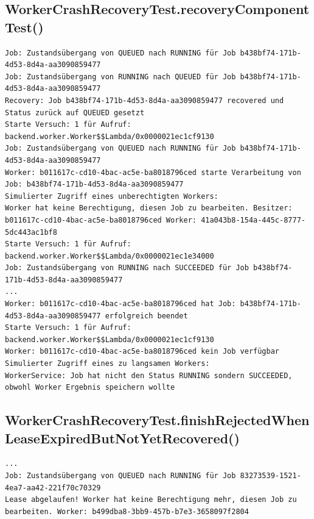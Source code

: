 \subsection*{WorkerCrashRecoveryTest.recoveryComponentTest()}
\label{subsec:testlog_z8_a}
\begin{lstlisting}[language={}, style=logs, numbers=none]
Job: Zustandsübergang von QUEUED nach RUNNING für Job b438bf74-171b-4d53-8d4a-aa3090859477
Job: Zustandsübergang von RUNNING nach QUEUED für Job b438bf74-171b-4d53-8d4a-aa3090859477
Recovery: Job b438bf74-171b-4d53-8d4a-aa3090859477 recovered und Status zurück auf QUEUED gesetzt
Starte Versuch: 1 für Aufruf: backend.worker.Worker$$Lambda/0x0000021ec1cf9130
Job: Zustandsübergang von QUEUED nach RUNNING für Job b438bf74-171b-4d53-8d4a-aa3090859477
Worker: b011617c-cd10-4bac-ac5e-ba8018796ced starte Verarbeitung von Job: b438bf74-171b-4d53-8d4a-aa3090859477
Simulierter Zugriff eines unberechtigten Workers:
Worker hat keine Berechtigung, diesen Job zu bearbeiten. Besitzer: b011617c-cd10-4bac-ac5e-ba8018796ced Worker: 41a043b8-154a-445c-8777-5dc443ac1bf8
Starte Versuch: 1 für Aufruf: backend.worker.Worker$$Lambda/0x0000021ec1e34000
Job: Zustandsübergang von RUNNING nach SUCCEEDED für Job b438bf74-171b-4d53-8d4a-aa3090859477
...
Worker: b011617c-cd10-4bac-ac5e-ba8018796ced hat Job: b438bf74-171b-4d53-8d4a-aa3090859477 erfolgreich beendet
Starte Versuch: 1 für Aufruf: backend.worker.Worker$$Lambda/0x0000021ec1cf9130
Worker: b011617c-cd10-4bac-ac5e-ba8018796ced kein Job verfügbar
Simulierter Zugriff eines zu langsamen Workers:
WorkerService: Job hat nicht den Status RUNNING sondern SUCCEEDED, obwohl Worker Ergebnis speichern wollte
\end{lstlisting}

\subsection*{WorkerCrashRecoveryTest.finishRejectedWhenLeaseExpiredButNotYetRecovered()}
\label{subsec:testlog_z8_b}
\begin{lstlisting}[language={}, style=logs, numbers=none]
...
Job: Zustandsübergang von QUEUED nach RUNNING für Job 83273539-1521-4ea7-aa42-221f70c70329
Lease abgelaufen! Worker hat keine Berechtigung mehr, diesen Job zu bearbeiten. Worker: b499dba8-3bb9-457b-b7e3-3658097f2804
\end{lstlisting}

